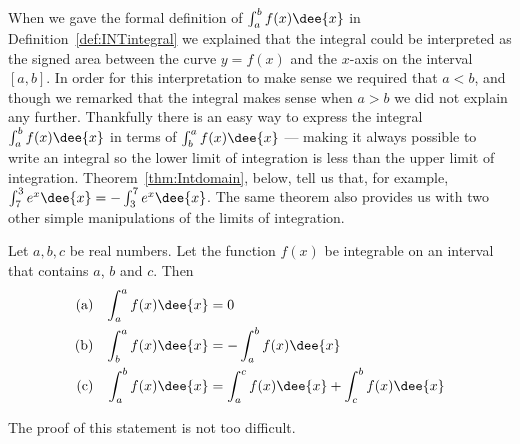 When we gave the formal definition of $\int_a^b f(x) \dee{x}$ in
Definition~\ref{def:INTintegral} we explained that the integral could be
interpreted as the signed area between the curve $y=f(x)$ and the $x$-axis on
the interval $[a,b]$. In order for this interpretation to make sense we
required
that $a<b$, and though we remarked that the integral makes sense when $a>b$ we
did not explain any further. Thankfully there is an easy way to express the
integral $\int_a^b f(x)\dee{x}$ in terms of $\int_b^a f(x)\dee{x}$ --- making
it
always possible to write an integral so the lower limit of integration
is less than the upper limit of integration. Theorem~\ref{thm:Intdomain},
below,
tell us that, for example, $\int_7^3 e^x\dee{x} = - \int_3^7 e^x\dee{x}$. The same
theorem also provides us with two other simple manipulations of the limits of
integration.
\begin{theorem}\label{thm:Intdomain}
Let $a,b,c$  be real numbers. Let the function $f(x)$
be integrable on an interval that contains $a$, $b$ and $c$. Then
\begin{align*}
\text{(a)}&&
\int_a^a f(x)\dee{x}&= 0\\
\text{(b)}&&
\int_b^a f(x)\dee{x}&= -\int_a^b f(x)\dee{x} \\
\text{(c)}&&
\int_a^b f(x)\dee{x}&= \int_a^c f(x)\dee{x} + \int_c^b f(x)\dee{x}
\end{align*}
\end{theorem}
The proof of this statement is not too difficult.
